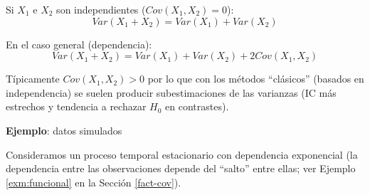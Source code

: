 \documentclass[
]{book}
\theoremstyle{break}
\theoremstyle{nonumberplain}
\begin{document}
Si \(X_{1}\) e \(X_{2}\) son independientes (\(Cov(X_{1},X_{2})=0\)):
\[Var(X_{1}+X_{2})=Var(X_{1})+Var(X_{2})\]

En el caso general (dependencia):
\[Var(X_{1}+X_{2})=Var(X_{1})+Var(X_{2})+2Cov(X_{1},X_{2})\]

Típicamente \(Cov(X_{1},X_{2})>0\) por lo que con los métodos
``clásicos'' (basados en independencia) se suelen producir
subestimaciones de las varianzas (IC más estrechos y tendencia a
rechazar \(H_{0}\) en contrastes).

\textbf{Ejemplo}: datos simulados

Consideramos un proceso temporal estacionario con dependencia exponencial
(la dependencia entre las observaciones depende del ``salto'' entre ellas;
ver Ejemplo \ref{exm:funcional} en la Sección \ref{fact-cov}).
\end{document}
